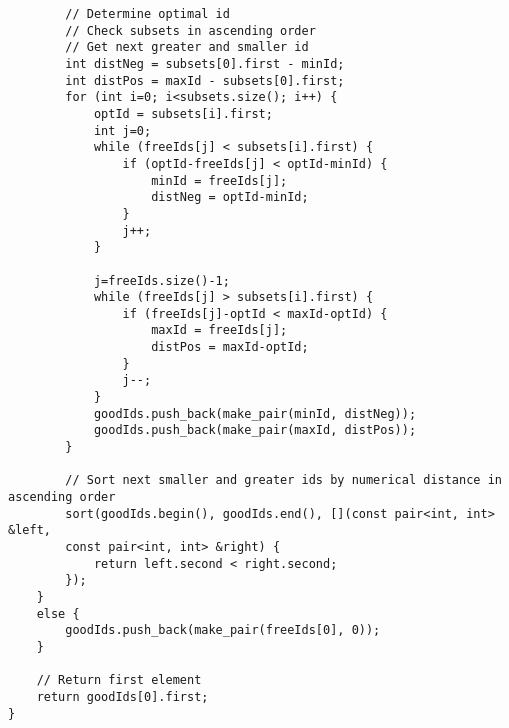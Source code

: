{\begin{verbatim}
        // Determine optimal id
        // Check subsets in ascending order
        // Get next greater and smaller id
        int distNeg = subsets[0].first - minId;
        int distPos = maxId - subsets[0].first;
        for (int i=0; i<subsets.size(); i++) {
            optId = subsets[i].first;
            int j=0;
            while (freeIds[j] < subsets[i].first) {
                if (optId-freeIds[j] < optId-minId) {
                    minId = freeIds[j];
                    distNeg = optId-minId;
                }
                j++;
            }
            
            j=freeIds.size()-1;
            while (freeIds[j] > subsets[i].first) {
                if (freeIds[j]-optId < maxId-optId) {
                    maxId = freeIds[j];
                    distPos = maxId-optId;
                }
                j--;
            }
            goodIds.push_back(make_pair(minId, distNeg));
            goodIds.push_back(make_pair(maxId, distPos));
        }
        
        // Sort next smaller and greater ids by numerical distance in ascending order
        sort(goodIds.begin(), goodIds.end(), [](const pair<int, int> &left, 
        const pair<int, int> &right) {
            return left.second < right.second;
        });
    }
    else {
        goodIds.push_back(make_pair(freeIds[0], 0));
    }
    
    // Return first element
    return goodIds[0].first;
}
\end{verbatim}
}
